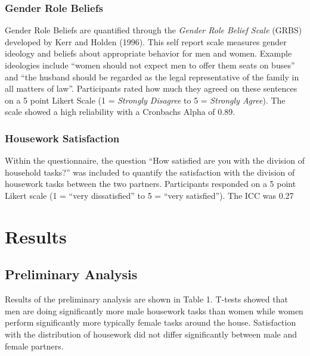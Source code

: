 \documentclass[
  man,floatsintext]{apa6}
\begin{document}
\hypertarget{gender-role-beliefs}{%
\subsubsection{Gender Role Beliefs}\label{gender-role-beliefs}}

Gender Role Beliefs are quantified through the \emph{Gender Role Belief Scale} (GRBS) developed by Kerr and Holden (1996). This self report scale measures gender ideology and beliefs about appropriate behavior for men and women. Example ideologies include ``women should not expect men to offer them seats on buses'' and ``the husband should be regarded as the legal representative of the family in all matters of law''. Participants rated how much they agreed on these sentences on a 5 point Likert Scale (1 = \emph{Strongly Disagree} to 5 = \emph{Strongly Agree}). The scale showed a high reliability with a Cronbachs Alpha of 0.89.

\hypertarget{housework-satisfaction}{%
\subsubsection{Housework Satisfaction}\label{housework-satisfaction}}

Within the questionnaire, the question ``How satisfied are you with the division of household tasks?'' was included to quantify the satisfaction with the division of housework tasks between the two partners. Participants responded on a 5 point Likert scale (1 = ``very dissatisfied'' to 5 = ``very satisfied''). The ICC was 0.27

\hypertarget{results}{%
\section{Results}\label{results}}

\hypertarget{preliminary-analysis}{%
\subsection{Preliminary Analysis}\label{preliminary-analysis}}

Results of the preliminary analysis are shown in Table 1. T-tests showed that men are doing significantly more male housework tasks than women while women perform significantly more typically female tasks around the house. Satisfaction with the distribution of housework did not differ significantly between male and female partners.

\newpage
\end{document}
